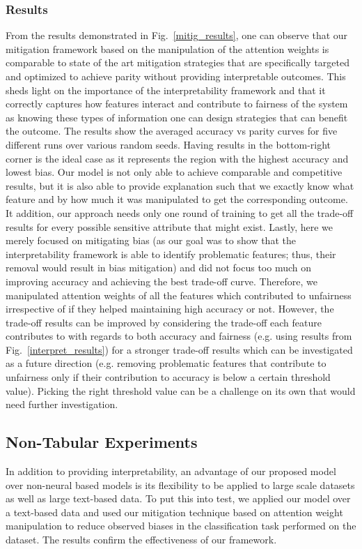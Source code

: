 \subsubsection{Results}
From the results demonstrated in Fig.~\ref{mitig_results}, one can observe that our mitigation framework based on the manipulation of the attention weights is comparable to state of the art mitigation strategies that are specifically targeted and optimized to achieve parity without providing interpretable outcomes. This sheds light on the importance of the interpretability framework and that it correctly captures how features interact and contribute to fairness of the system as knowing these types of information one can design strategies that can benefit the outcome. The results show the averaged accuracy vs parity curves for five different runs over various random seeds. Having results in the bottom-right corner is the ideal case as it represents the region with the highest accuracy and lowest bias. Our model is not only able to achieve comparable and competitive results, but it is also able to provide explanation such that we exactly know what feature and by how much it was manipulated to get the corresponding outcome. It addition, our approach needs only one round of training to get all the trade-off results for every possible sensitive attribute that might exist. Lastly, here we merely focused on mitigating bias (as our goal was to show that the interpretability framework is able to identify problematic features; thus, their removal would result in bias mitigation) and did not focus too much on improving accuracy and achieving the best trade-off curve. Therefore, we manipulated attention weights of all the features which contributed to unfairness irrespective of if they helped maintaining high accuracy or not. However, the trade-off results can be improved by considering the trade-off each feature contributes to with regards to both accuracy and fairness (e.g. using results from Fig.~\ref{interpret_results}) for a stronger trade-off results which can be investigated as a future direction (e.g. removing problematic features that contribute to unfairness only if their contribution to accuracy is below a certain threshold value). Picking the right threshold value can be a challenge on its own that would need further investigation.

\subsection{Non-Tabular Experiments}
In addition to providing interpretability, an advantage of our proposed model over non-neural based models is its flexibility to be applied to large scale datasets as well as large text-based data. To put this into test, we applied our model over a text-based data and used our mitigation technique based on attention weight manipulation to reduce observed biases in the classification task performed on the dataset. The results confirm the effectiveness of our framework.
